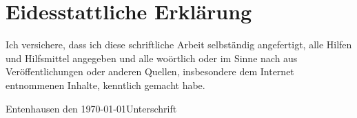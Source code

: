 \chapter*{Eidesstattliche Erklärung}

Ich versichere, dass ich diese schriftliche Arbeit selbst\"andig angefertigt, alle Hilfen und Hilfsmittel angegeben und alle wo\"ortlich oder im Sinne nach aus Ver\"offentlichungen oder anderen Quellen, insbesondere dem Internet entnommenen Inhalte, kenntlich gemacht habe.

\vspace{4cm}

\hspace{2cm} Entenhausen den \today \hfill Unterschrift \hspace{2cm}
